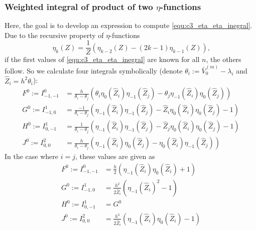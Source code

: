 \subsubsection{Weighted integral of product of two \texorpdfstring{$\eta$}{eta}-functions}

Here, the goal is to develop an expression to compute \eqref{equ:c3_eta_eta_inegral}. Due to the recursive property of $\eta$-functions
$$
  \eta_k(Z) = \frac{1}{Z}\left(\eta_{k-2}(Z) - (2k-1)\eta_{k-1}(Z)  \right)\text{,}
$$
if the first values of \eqref{equ:c3_eta_eta_inegral} are known for all $n$, the others follow. So we calculate four integrals symbolically (denote $\theta_i := \bar{V}_0^{(m)} -  \lambda_i$ and $\hat{Z}_i = h^2\theta_i$):
\begin{align*}
  F^0 := I_{-1,-1}^0 & = \frac{h}{\theta_i - \theta_j}\left(\theta_i \eta_0(\hat{Z}_i)\eta_{-1}(\hat{Z}_j) - \theta_j \eta_{-1}(\hat{Z}_i)\eta_0(\hat{Z}_j)\right)   \\
  G^0 := I_{-1, 0}^1 & = \frac{-1}{\theta_i - \theta_j}\left(\eta_{-1}(\hat{Z}_i)\eta_{-1}(\hat{Z}_j) - \hat{Z}_i \eta_{0}(\hat{Z}_i)\eta_{0}(\hat{Z}_j)  - 1\right) \\
  H^0 := I_{0, -1}^1 & = \frac{1}{\theta_i - \theta_j}\left(\eta_{-1}(\hat{Z}_i)\eta_{-1}(\hat{Z}_j) - \hat{Z}_j \eta_{0}(\hat{Z}_i)\eta_{0}(\hat{Z}_j)  - 1\right)  \\
  J^0 := I_{0,0}^{2} & = \frac{h}{\theta_i - \theta_j}\left(\eta_{-1}(\hat{Z}_i)\eta_{0}(\hat{Z}_j) - \eta_{0}(\hat{Z}_i)\eta_{-1}(\hat{Z}_j)\right)
\end{align*}
In the case where $i = j$, these values are given as
\begin{align*}
  F^0 := I_{-1,-1}^0 & = \frac{h}{2} \left(\eta_{-1}(\hat{Z}_i) \eta_{0}(\hat{Z}_i) + 1\right)             \\
  G^0 := I_{-1, 0}^1 & = \frac{h^2}{2 \hat{Z}_i} \left(\eta_{-1}(\hat{Z}_i)^2 - 1\right)                   \\
  H^0 := I_{0, -1}^1 & = G^0                                                                               \\
  J^0 := I_{0,0}^{2} & = \frac{h^3}{2 \hat{Z}_i} \left(\eta_{-1}(\hat{Z}_i) \eta_{0}(\hat{Z}_i) - 1\right)
\end{align*}


